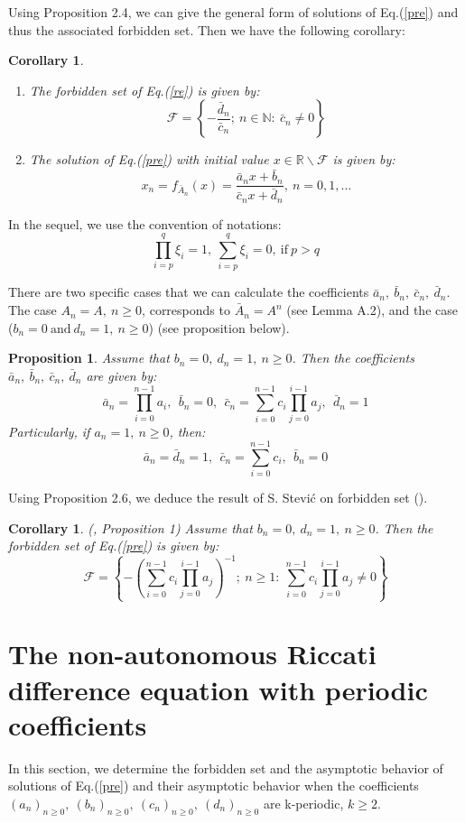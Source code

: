\documentclass[11pt]{amsart}
\newtheorem{cor}[thm]{Corollary}
\newtheorem{prop}[thm]{Proposition}
\theoremstyle{definition}
\theoremstyle{remark}
\theoremstyle{example}
\numberwithin{equation}{section}
\begin{document}
Using Proposition 2.4, we can give the general form of solutions of Eq.(\ref{pre}) and thus the associated forbidden set.
Then we have the following corollary:
\medskip
\begin{cor}\rm{
\noindent
\begin{enumerate}[leftmargin=*]
\item The forbidden set of Eq.(\ref{re}) is given by:
$$\mathcal{F}=\left\{-\frac{\bar{d}_n}{\bar{c}_n}; \ n\in\mathbb{N}:\  \bar{c}_n\neq0\right\}$$
\item The solution of Eq.(\ref{pre}) with initial value $x \in \mathbb{R}\backslash\mathcal{F}$ is given by:
$$x_n=f_{\bar{A}_n}(x)=\frac{\bar{a}_nx+\bar{b}_n}{\bar{c}_nx+\bar{d}_n}, \ n=0,1,\ldots$$
\end{enumerate}
}\end{cor}
\medskip
In the sequel, we use the convention of notations: $$\prod\limits_{i=p}^q\xi_i=1, \ \sum\limits_{i=p}^q\xi_i=0, \ \text{if} \ p>q$$

There are two specific cases that we can calculate the coefficients $\bar{a}_n, \ \bar{b}_n, \ \bar{c}_n, \ \bar{d}_n$.
The case $A_n=A, \ n\geq0$, corresponds to $\bar{A}_n=A^n$ (see Lemma A.2), and
the case ($b_n=0 \ \text{and} \ d_n=1, \ n\geq0$) (see proposition below).

\medskip
\begin{prop}\rm{
Assume that $b_n=0, \ d_n=1, \ n\geq0$. Then the coefficients $\bar{a}_n, \ \bar{b}_n, \ \bar{c}_n, \ \bar{d}_n$ are given by:
$$\bar{a}_n=\prod_{i=0}^{n-1} a_i, \ \ \bar{b}_n=0, \ \ \bar{c}_n=\sum_{i=0}^{n-1}c_i\prod_{j=0}^{i-1}a_j, \ \ \bar{d}_n=1$$
Particularly, if $a_n=1, \ n\geq0$, then:
$$\bar{a}_n=\bar{d}_n=1, \ \ \bar{c}_n=\sum_{i=0}^{n-1}c_i, \ \ \bar{b}_n=0$$
}\end{prop}
\medskip
Using Proposition 2.6, we deduce the result of S. Stevi\'c on forbidden set (\cite{7}).
\medskip
\begin{cor}\rm{(\cite{7}, Proposition 1)
Assume that $b_n=0, \ d_n=1, \ n\geq0$. Then the forbidden set of Eq.(\ref{pre}) is given by:
$$\mathcal{F}=\left\{-\left(\sum_{i=0}^{n-1}c_i\prod_{j=0}^{i-1}a_j\right)^{-1}; \ n\geq1: \  \sum_{i=0}^{n-1}c_i\prod_{j=0}^{i-1}a_j\neq0\right\}$$
}\end{cor}
\medskip

\medskip

\section{\bf The non-autonomous Riccati difference equation with periodic coefficients}
\medskip
In this section, we determine the forbidden set and the asymptotic behavior of solutions of Eq.(\ref{pre}) and their asymptotic behavior when the coefficients $(a_n)_{n\geq0}, \ (b_n)_{n\geq0}, \ (c_n)_{n\geq0}, \ (d_n)_{n\geq0}$ are k-periodic, $k\geq2$.
\end{document}
